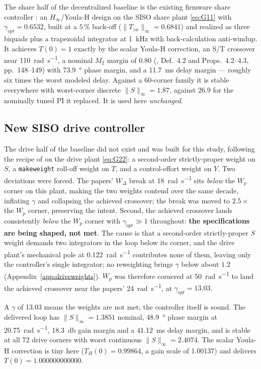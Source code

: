 \documentclass[energies,article,submit,pdftex,oneauthor]{Definitions/mdpi}
\begin{document}
The share half of the decentralized baseline is the existing firmware share controller
\citep{internal:droop}: an $H_\infty$/Youla-H design on the SISO share plant \eqref{eq:G11} with
$\gamma_{opt} = 0.6532$, built at a $5\,\%$ back-off ($\|T_{zw}\|_\infty = 0.6841$) and realized
as three biquads plus a trapezoidal integrator at \SI{1}{\kilo\hertz} with back-calculation
anti-windup. It achieves $T(0)=1$ exactly by the scalar Youla-H correction, an S/T crossover near
\SI{110}{\radian\per\second}, a nominal $M_2$ margin of \num{0.80}
(\citep{assadian2020neoclassical}, Def.~4.2 and Props.~4.2--4.3, pp.~148--149) with
\SI{73.9}{\degree} phase
margin, and a \SI{11.7}{\milli\second} delay margin --- roughly six times the worst modeled
delay. Against a 60-corner family it is stable everywhere with worst-corner discrete
$\|S\|_\infty = 1.87$, against \num{26.9} for the nominally tuned PI it replaced. It is used here
\emph{unchanged}.

\subsection{New SISO drive controller}

The drive half of the baseline did not exist and was built for this study, following the recipe
of \citep{tan2025scaling,tan2025youlah} on the drive plant \eqref{eq:G22}: a second-order
strictly-proper weight on $S$, a \texttt{makeweight} roll-off weight on $T$, and a control-effort
weight on $Y$. Two deviations were forced. The papers' $W_{\Delta}$ break at
\SI{18}{\radian\per\second} sits \emph{below} the $W_p$ corner on this plant, making the two
weights contend over the same decade, inflating $\gamma$ and collapsing the achieved crossover;
the break was moved to $2.5\times$ the $W_p$ corner, preserving the intent. Second, the achieved
crossover lands consistently \emph{below} the $W_p$
corner with $\gamma_{opt}\gg1$ throughout: \textbf{the specifications are being shaped, not met}.
The cause is that a second-order strictly-proper $S$ weight demands two integrators in the loop
below its corner, and the drive plant's mechanical pole at \SI{0.122}{\radian\per\second}
contributes none of them, leaving only the controller's single integrator; no reweighting brings
$\gamma$ below about $1.2$ (Appendix~\ref{app:driveweights}). $W_p$ was therefore cornered at
\SI{50}{\radian\per\second} to land the achieved crossover near the papers'
\SI{24}{\radian\per\second}, at $\gamma_{opt} = \num{13.03}$.

A $\gamma$ of \num{13.03} means the weights are not met; the controller itself is sound. The
delivered loop has $\|S\|_\infty = 1.3851$ nominal, \SI{48.9}{\degree} phase margin at
\SI{20.75}{\radian\per\second}, \SI{18.3}{\decibel} gain margin and a \SI{41.12}{\milli\second}
delay margin, and is stable at all 72 drive corners with worst continuous
$\|S\|_\infty = 2.4074$. The scalar Youla-H correction is tiny here ($T_H(0) = 0.99864$, a gain
scale of \num{1.00137}) and delivers $T(0) = 1.000000000000$.
\end{document}
